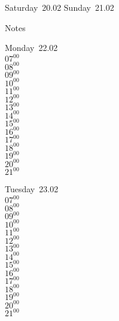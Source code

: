 \documentclass[11pt,a4paper]{book}\usepackage[]{graphicx}\usepackage[]{color}
\begin{document}
\begin{weekendbox}
  Saturday~20.02
  \tcblower
  Sunday~21.02
\end{weekendbox} %
\begin{notebox}
  Notes
\end{notebox}
\clearpage
\begin{headerbox}
\end{headerbox}
\begin{weekdaybox}
  Monday~22.02\\
  { 
  \vfill
  $07^{00}$\\
$08^{00}$\\
$09^{00}$\\
$10^{00}$\\
$11^{00}$\\
$12^{00}$\\
$13^{00}$\\
$14^{00}$\\
$15^{00}$\\
$16^{00}$\\
$17^{00}$\\
$18^{00}$\\
$19^{00}$\\
$20^{00}$\\
$21^{00}$\\
  }
\end{weekdaybox}
\begin{weekdaybox}
  Tuesday~23.02\\
  { 
  \vfill
  $07^{00}$\\
$08^{00}$\\
$09^{00}$\\
$10^{00}$\\
$11^{00}$\\
$12^{00}$\\
$13^{00}$\\
$14^{00}$\\
$15^{00}$\\
$16^{00}$\\
$17^{00}$\\
$18^{00}$\\
$19^{00}$\\
$20^{00}$\\
$21^{00}$\\
  }
\end{weekdaybox}
\end{document}
